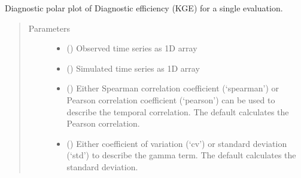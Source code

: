 \documentclass[letterpaper,10pt,english]{sphinxmanual}
\begin{document}
\begin{fulllineitems}
\label{\detokenize{reference/kge:de.kge.diag_polar_plot}}
Diagnostic polar plot of Diagnostic efficiency (KGE) for a single
evaluation.
\begin{quote}\begin{description}
\item[{Parameters}] \leavevmode\begin{itemize}
\item {} 
 (\sphinxstyleliteralemphasis{\sphinxupquote{(}}\sphinxstyleliteralemphasis{\sphinxupquote{,}}\sphinxstyleliteralemphasis{\sphinxupquote{)}}) \textendash{} Observed time series as 1\sphinxhyphen{}D array

\item {} 
 (\sphinxstyleliteralemphasis{\sphinxupquote{(}}\sphinxstyleliteralemphasis{\sphinxupquote{,}}\sphinxstyleliteralemphasis{\sphinxupquote{)}}) \textendash{} Simulated time series as 1\sphinxhyphen{}D array

\item {} 
 (\sphinxstyleliteralemphasis{\sphinxupquote{, }}) \textendash{} Either Spearman correlation coefficient (‘spearman’) or Pearson
correlation coefficient (‘pearson’) can be used to describe the
temporal correlation. The default calculates the Pearson correlation.

\item {} 
 (\sphinxstyleliteralemphasis{\sphinxupquote{, }}) \textendash{} Either coefficient of variation (‘cv’) or standard deviation (‘std’)
to describe the gamma term. The default calculates the standard
deviation.


\end{itemize}
\end{description}
\end{quote}
\end{fulllineitems}
\end{document}
